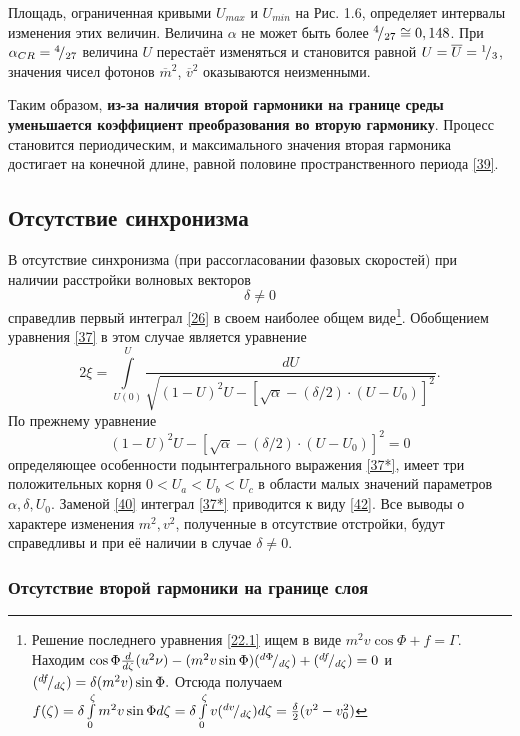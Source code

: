 \documentclass[a4paper]{article}
\begin{document}
	Площадь, ограниченная кривыми $U_{max}$ и $U_{min}$ на Рис. 1.6, определяет интервалы изменения этих величин. Величина $\alpha$ не может быть более ${}^{4}\!/_{27}\cong0,148$. При $\alpha_{CR}= {}^{4}\!/_{27}$ величина $U$ перестаёт изменяться и становится равной $U=\overline{U}={}^{1}\!/_{3}$, значения чисел фотонов $\overline{m}^{2}$, $\overline{v}^{2}$  оказываются неизменными. 
	
	Таким образом, \textbf{из-за наличия второй гармоники на границе среды уменьшается коэффициент преобразования во вторую гармонику}. Процесс становится периодическим, и максимального значения вторая гармоника достигает на конечной длине, равной половине пространственного периода \eqref{39}. 
	\subsection{Отсутствие синхронизма}
	В отсутствие синхронизма (при рассогласовании фазовых скоростей) при наличии расстройки волновых векторов
	\begin{equation}
		\delta\neq0\label{45}
	\end{equation}
	справедлив первый интеграл \eqref{26} в своем наиболее общем  виде\footnote{Решение последнего уравнения \eqref{22.1} ищем в виде $m^{2}v\cos\Phi+f=\Gamma$. Находим $\cos\Phi\frac{d}{d\zeta}(u^{2}\nu)-(m^{2}v\sin\Phi)({}^{d\Phi}\!/_{d\zeta})+({}^{df}\!/_{d\zeta})=0$ и $({}^{df}\!/_{d\zeta})=\delta(m^{2}v)\sin\Phi.$ Отсюда получаем $f(\zeta)=\delta\int\limits_{0}^{\zeta}m^{2}v\sin\Phi d\zeta=\delta\int\limits_{0}^{\zeta}v({}^{dv}\!/_{d\zeta})d\zeta=\frac{\delta}{2}(v^{2}-v_{0}^{2})$}. Обобщением  уравнения \eqref{37} в этом случае является уравнение 
	\begin{equation}
		2\xi=\int\limits_{U(0)}^{U}\frac{dU}{\sqrt{(1-U)^{2}U-\left[\sqrt{\alpha}-(\delta/2)\cdot(U-U_{0})\right]^{2}}}.\tag{37*}\label{37*}
	\end{equation}
	По прежнему уравнение 
	\begin{equation}
		(1-U)^{2}U-\left[\sqrt{\alpha}-(\delta/2)\cdot(U-U_{0})\right]^{2}=0\tag{38*}\label{38*}
	\end{equation}
	определяющее особенности подынтегрального выражения \eqref{37*}, имеет три положительных корня $0<U_{a}<U_{b}<U_{c}$ в области малых значений параметров $\alpha,\delta,U_{0}$. Заменой \eqref{40} интеграл \eqref{37*} приводится к виду \eqref{42}. Все выводы о характере изменения $m^{2}, v^{2}$, полученные в отсутствие отстройки, будут справедливы и при её наличии в случае $\delta\neq0$.
	\subsubsection{Отсутствие второй гармоники на границе слоя }
	
\end{document}
